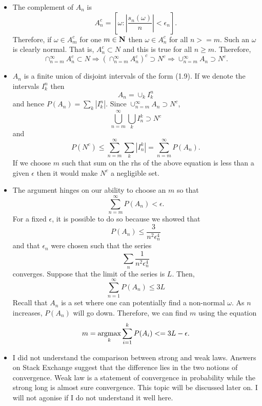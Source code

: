 \begin{itemize}
\item The complement of $A_n$ is
\[
A_n^c = \left[\omega: \left|\frac{s_n(\omega)}{n}\right| < \epsilon_n\right].
\]
Therefore, if $\omega \in A_m^c$ for one $m \in \mathbf{N}$ then $\omega \in A_n^c$
for all $n >= m$. Such an $\omega$ is clearly normal. That is, $A_n^c \subset N$
and this is true for all $n \ge m$. Therefore,
\[
\cap_{n=m}^\infty A_n^c \subset N \Rightarrow 
\left(\cap_{n=m}^\infty A_n^c\right)^c \supset N^c \Rightarrow 
\cup_{n=m}^\infty A_n \supset N^c.
\]

\item $A_n$ is a finite union of disjoint intervals of the form (1.9). If we
denote the intervals $I^n_k$ then
\[
A_n = \cup_{k} I^n_k
\]
and hence $P(A_n) = \sum_k |I_k^n|$. Since $\cup_{n=m}^\infty A_n \supset N^c$,
\[
\bigcup_{n=m}^\infty\bigcup_{k} I_n^k \supset N^c
\]
and
\[
P(N^c) \le \sum_{n=m}^\infty\sum_k |I_n^k| = \sum_{n=m}^\infty P(A_n).
\]
If we choose $m$ such that sum on the rhs of the above equation is less than
a given $\epsilon$ then it would make $N^c$ a negligible set.

\item The argument hinges on our ability to choose an $m$ so that
\[
\sum_{n=m}^\infty P(A_n) < \epsilon.
\]
For a fixed $\epsilon$, it is possible to do so because we showed that 
\[
P(A_n) \le \frac{3}{n^2\epsilon_n^4}
\]
and that $\epsilon_n$ were chosen such that the series 
\[
\sum_n\frac{1}{n^2\epsilon_n^4}
\]
converges. Suppose that the limit of the series is $L$. Then,
\[
\sum_{n=1}^\infty P(A_n) \le 3L
\]
Recall that $A_n$ is a set where one can potentially find a non-normal $\omega$.
As $n$ increases, $P(A_n)$ will go down. Therefore, we can find $m$ using the
equation
\[
m = \operatorname*{argmax}_k \sum_{i=1}^k P(A_i) <= 3L - \epsilon.
\]

\item I did not understand the comparison between strong and weak laws. Answers
on Stack Exchange suggest that the difference lies in the two notions of 
convergence. Weak law is a statement of convergence in probability while the
strong long is almost sure convergence. This topic will be discussed later on.
I will not agonise if I do not understand it well here.


\end{itemize}

